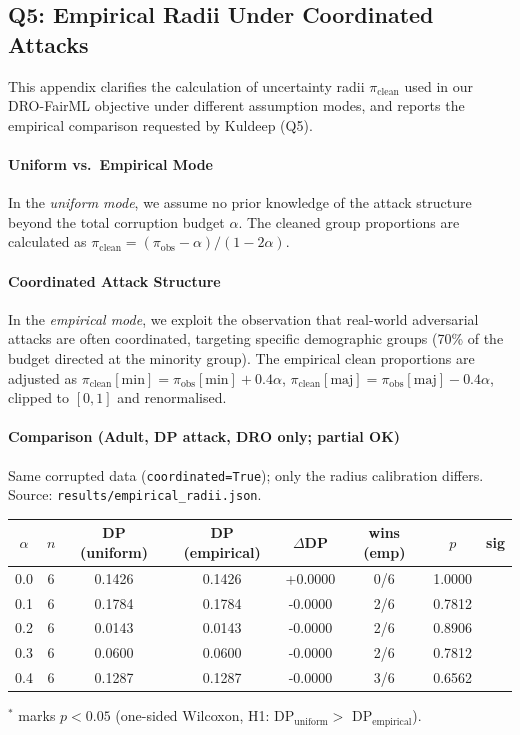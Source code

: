 \subsection{Q5: Empirical Radii Under Coordinated Attacks}
\label{app:empirical-radii}

This appendix clarifies the calculation of uncertainty radii $\pi_{\mathrm{clean}}$ used in our DRO-FairML objective under different assumption modes, and reports the empirical comparison requested by Kuldeep (Q5).

\paragraph{Uniform vs.\ Empirical Mode}
In the \textit{uniform mode}, we assume no prior knowledge of the attack structure beyond the total corruption budget $\alpha$. The cleaned group proportions are calculated as $\pi_{\mathrm{clean}} = (\pi_{\mathrm{obs}} - \alpha)/(1 - 2\alpha)$.

\paragraph{Coordinated Attack Structure}
In the \textit{empirical mode}, we exploit the observation that real-world adversarial attacks are often coordinated, targeting specific demographic groups (70\% of the budget directed at the minority group). The empirical clean proportions are adjusted as $\pi_{\mathrm{clean}}[\mathrm{min}] = \pi_{\mathrm{obs}}[\mathrm{min}] + 0.4\alpha$, $\pi_{\mathrm{clean}}[\mathrm{maj}] = \pi_{\mathrm{obs}}[\mathrm{maj}] - 0.4\alpha$, clipped to $[0,1]$ and renormalised.

\paragraph{Comparison (Adult, DP attack, DRO only; partial OK)}
Same corrupted data (\texttt{coordinated=True}); only the radius calibration differs. Source: \texttt{results/empirical\_radii.json}.

\begin{center}
\begin{tabular}{cccccccc}
\toprule
$\alpha$ & $n$ & DP (uniform) & DP (empirical) & $\Delta$DP & wins (emp) & $p$ & sig \\
\midrule
0.0 & 6 & 0.1426 & 0.1426 & +0.0000 & 0/6 & 1.0000 &  \\
0.1 & 6 & 0.1784 & 0.1784 & -0.0000 & 2/6 & 0.7812 &  \\
0.2 & 6 & 0.0143 & 0.0143 & -0.0000 & 2/6 & 0.8906 &  \\
0.3 & 6 & 0.0600 & 0.0600 & -0.0000 & 2/6 & 0.7812 &  \\
0.4 & 6 & 0.1287 & 0.1287 & -0.0000 & 3/6 & 0.6562 &  \\
\bottomrule
\end{tabular}
\end{center}
$^{*}$ marks $p<0.05$ (one-sided Wilcoxon, H1: DP$_{\mathrm{uniform}} > $ DP$_{\mathrm{empirical}}$).

